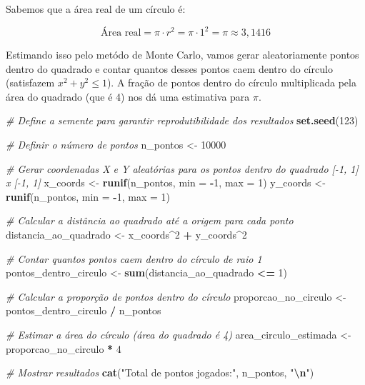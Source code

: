 \documentclass[
]{book}
\newenvironment{Shaded}{\begin{snugshade}}{\end{snugshade}}
\newcommand{\AttributeTok}[1]{\textcolor[rgb]{0.13,0.29,0.53}{#1}}
\newcommand{\CommentTok}[1]{\textcolor[rgb]{0.56,0.35,0.01}{\textit{#1}}}
\newcommand{\DecValTok}[1]{\textcolor[rgb]{0.00,0.00,0.81}{#1}}
\newcommand{\FunctionTok}[1]{\textcolor[rgb]{0.13,0.29,0.53}{\textbf{#1}}}
\newcommand{\NormalTok}[1]{#1}
\newcommand{\OtherTok}[1]{\textcolor[rgb]{0.56,0.35,0.01}{#1}}
\newcommand{\SpecialCharTok}[1]{\textcolor[rgb]{0.81,0.36,0.00}{\textbf{#1}}}
\newcommand{\StringTok}[1]{\textcolor[rgb]{0.31,0.60,0.02}{#1}}
\begin{document}
Sabemos que a área real de um círculo é:

\[
\text{Área real} = \pi \cdot r^2 = \pi \cdot 1^2 = \pi \approx 3,1416
\]

Estimando isso pelo metódo de Monte Carlo, vamos gerar aleatoriamente pontos dentro do quadrado e contar quantos desses pontos caem dentro do círculo (satisfazem \(x^2 + y^2 \leq 1\)). A fração de pontos dentro do círculo multiplicada pela área do quadrado (que é 4) nos dá uma estimativa para \(\pi\).

\begin{Shaded}
\begin{Highlighting}[]
\CommentTok{\# Define a semente para garantir reprodutibilidade dos resultados}
\FunctionTok{set.seed}\NormalTok{(}\DecValTok{123}\NormalTok{)}

\CommentTok{\# Definir o número de pontos }
\NormalTok{n\_pontos }\OtherTok{\textless{}{-}} \DecValTok{10000}

\CommentTok{\# Gerar coordenadas X e Y aleatórias para os pontos dentro do quadrado [{-}1, 1] x [{-}1, 1]}
\NormalTok{x\_coords }\OtherTok{\textless{}{-}} \FunctionTok{runif}\NormalTok{(n\_pontos, }\AttributeTok{min =} \SpecialCharTok{{-}}\DecValTok{1}\NormalTok{, }\AttributeTok{max =} \DecValTok{1}\NormalTok{)}
\NormalTok{y\_coords }\OtherTok{\textless{}{-}} \FunctionTok{runif}\NormalTok{(n\_pontos, }\AttributeTok{min =} \SpecialCharTok{{-}}\DecValTok{1}\NormalTok{, }\AttributeTok{max =} \DecValTok{1}\NormalTok{)}

\CommentTok{\# Calcular a distância ao quadrado até a origem para cada ponto}
\NormalTok{distancia\_ao\_quadrado }\OtherTok{\textless{}{-}}\NormalTok{ x\_coords}\SpecialCharTok{\^{}}\DecValTok{2} \SpecialCharTok{+}\NormalTok{ y\_coords}\SpecialCharTok{\^{}}\DecValTok{2}

\CommentTok{\# Contar quantos pontos caem dentro do círculo de raio 1}
\NormalTok{pontos\_dentro\_circulo }\OtherTok{\textless{}{-}} \FunctionTok{sum}\NormalTok{(distancia\_ao\_quadrado }\SpecialCharTok{\textless{}=} \DecValTok{1}\NormalTok{)}

\CommentTok{\# Calcular a proporção de pontos dentro do círculo}
\NormalTok{proporcao\_no\_circulo }\OtherTok{\textless{}{-}}\NormalTok{ pontos\_dentro\_circulo }\SpecialCharTok{/}\NormalTok{ n\_pontos}

\CommentTok{\# Estimar a área do círculo (área do quadrado é 4)}
\NormalTok{area\_circulo\_estimada }\OtherTok{\textless{}{-}}\NormalTok{ proporcao\_no\_circulo }\SpecialCharTok{*} \DecValTok{4}

\CommentTok{\# Mostrar resultados}
\FunctionTok{cat}\NormalTok{(}\StringTok{"Total de pontos jogados:"}\NormalTok{, n\_pontos, }\StringTok{"}\SpecialCharTok{\textbackslash{}n}\StringTok{"}\NormalTok{)}
\end{Highlighting}
\end{Shaded}
\end{document}
